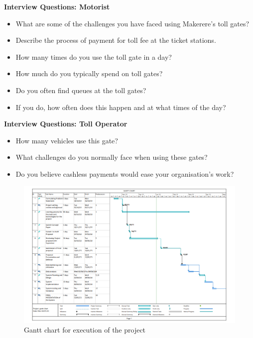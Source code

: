 \clearpage


\begin{appendices}
    \textbf{Interview Questions: Motorist}
    \begin{itemize}
        \item What are some of the challenges you have faced using Makerere's toll gates?
        \item Describe the process of payment for toll fee at the ticket stations.
        \item How many times do you use the toll gate in a day?
        \item How much do you typically spend on toll gates?
        \item Do you often find queues at the toll gates?
        \item If you do, how often does this happen and at what times of the day?
    \end{itemize}

    \textbf{Interview Questions: Toll Operator}
    \begin{itemize}
        \item How many vehicles use this gate?
        \item What challenges do you normally face when using these gates?
        \item Do you believe cashless payments would ease your organisation's work?
    \end{itemize}
    \begin{figure}
        \includegraphics[scale = 0.6]{images/gantt}
        \caption{Gantt chart for execution of the project}
    \end{figure}
\end{appendices}